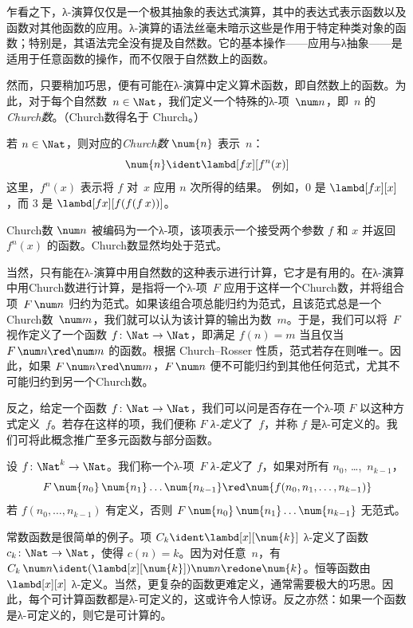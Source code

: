 \documentclass[../../../include/open-logic-section]{subfiles}
\begin{document}

乍看之下，λ-演算仅仅是一个极其抽象的表达式演算，其中的表达式表示函数以及函数对其他函数的应用。λ-演算的语法丝毫未暗示这些是作用于特定种类对象的函数；特别是，其语法完全没有提及自然数。它的基本操作——应用与λ抽象——是适用于任意函数的操作，而不仅限于自然数上的函数。

然而，只要稍加巧思，便有可能在λ-演算中定义算术函数，即自然数上的函数。为此，对于每个自然数~$n \in \Nat$，我们定义一个特殊的λ-项~$\num n$，即~$n$ 的\emph{Church数}。（Church数得名于 Church。）

\begin{defn}
  若 $n \in \Nat$，则对应的\emph{Church数} $\num{n}$ 表示~$n$：
  \[
    \num{n} \ident \lambd[fx][f^n(x)]
  \]
  这里，$f^n(x)$ 表示将 $f$ 对~$x$ 应用 $n$ 次所得的结果。
  例如，$\num{0}$ 是 $\lambd[fx][x]$，而 $\num{3}$ 是
  $\lambd[fx][f(f(f\,x))]$。
\end{defn}

Church数 $\num n$ 被编码为一个λ-项，该项表示一个接受两个参数 $f$ 和 $x$ 并返回 $f^n(x)$ 的函数。Church数显然均处于范式。

当然，只有能在λ-演算中用自然数的这种表示进行计算，它才是有用的。在λ-演算中用Church数进行计算，是指将一个λ-项~$F$ 应用于这样一个Church数，并将组合项~$F\, \num n$ 归约为范式。如果该组合项总能归约为范式，且该范式总是一个Church数~$\num m$，我们就可以认为该计算的输出为数~$m$。于是，我们可以将~$F$ 视作定义了一个函数 $f\colon \Nat \to \Nat$，即满足 $f(n) = m$ 当且仅当 $F\, \num n \red \num m$ 的函数。根据 Church--Rosser 性质，范式若存在则唯一。因此，如果 $F\, \num n \red \num m$，$F \, \num n$ 便不可能归约到其他任何范式，尤其不可能归约到另一个Church数。

反之，给定一个函数 $f\colon \Nat \to \Nat$，我们可以问是否存在一个λ-项 $F$ 以这种方式定义~$f$。若存在这样的项，我们便称 $F$ \emph{λ-定义}了~$f$，并称 $f$ 是λ-可定义的。我们可将此概念推广至多元函数与部分函数。

\begin{defn}
设 $f\colon \Nat^k \to \Nat$。我们称一个λ-项~$F$ \emph{λ-定义}了 $f$，如果对所有
$n_0$, \dots,~$n_{k-1}$，
\[
F \, \num{n_0} \, \num{n_1} \dots \num{n_{k-1}} \red \num{f(n_0, n_1, \dots,
  n_{k-1})}
\]
若 $f(n_0, \dots, n_{k-1})$ 有定义，否则 $F \, \num{n_0} \,
\num{n_1} \dots \num{n_{k-1}}$ 无范式。
\end{defn}

常数函数是很简单的例子。项 $C_k \ident
\lambd[x][\num{k}]$ λ-定义了函数 $c_k\colon \Nat \to
\Nat$，使得 $c(n) = k$。因为对任意~$n$，有 $C_k \, \num n \ident
(\lambd[x][\num{k}])\num n \redone \num{k}$。恒等函数由 $\lambd[x][x]$ λ-定义。当然，更复杂的函数更难定义，通常需要极大的巧思。因此，每个可计算函数都是λ-可定义的，这或许令人惊讶。反之亦然：如果一个函数是λ-可定义的，则它是可计算的。
\end{document}
